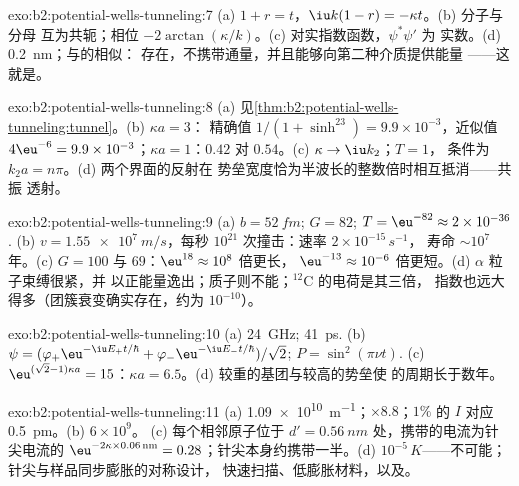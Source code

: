 \begin{solution}{exo:b2:potential-wells-tunneling:7}
(a) $1 + r = t$，$\iu k(1 - r) = -\kappa t$。(b) 分子与分母
互为共轭；相位 $-2\arctan(\kappa/k)$。(c) 对实指数函数，$\psi^*\psi'$ 为
实数。(d) \qty{0.2}{nm}；与的相似：
存在，不携带通量，并且能够向第二种介质提供能量
——这就是。
\end{solution}

\begin{solution}{exo:b2:potential-wells-tunneling:8}
(a) 见\cref{thm:b2:potential-wells-tunneling:tunnel}。(b) $\kappa a = 3$：
精确值 $1/(1 + \sinh^23) = 9.9 \times 10^{-3}$，近似值 $4\eu^{-6} = 9.9 \times
10^{-3}$；$\kappa a = 1$：$0.42$ 对 $0.54$。(c) $\kappa \to \iu k_2$；$T = 1$，
条件为 $k_2a = n\pi$。(d) 两个界面的反射在
势垒宽度恰为半波长的整数倍时相互抵消——共振
透射。
\end{solution}

\begin{solution}{exo:b2:potential-wells-tunneling:9}
(a) $b = \qty{52}{fm}$; $G = 82$; $T = \eu^{-82} \approx 2 \times 10^{-36}$. (b) $v =
\qty{1.55e7}{m/s}$，每秒 $10^{21}$ 次撞击：速率 $2 \times 10^{-15}\,\unit{s^{-1}}$，
寿命 $\sim 10^7$ 年。(c) $G = 100$ 与 $69$：$\eu^{18} \approx 10^8$ 倍更长，
$\eu^{-13} \approx 10^{-6}$ 倍更短。(d) $\alpha$ 粒子束缚很紧，并
以正能量逸出；质子则不能；$^{12}$C 的电荷是其三倍，
指数也远大得多（团簇衰变确实存在，约为 $10^{-10}$）。
\end{solution}

\begin{solution}{exo:b2:potential-wells-tunneling:10}
(a) \qty{24}{GHz}; \qty{41}{ps}. (b) $\psi = (\varphi_+\eu^{-\iu E_+t/\hbar} +
\varphi_-\eu^{-\iu E_-t/\hbar})/\sqrt2$; $P = \sin^2(\pi\nu t)$. (c) $\eu^{(\sqrt2 - 1)
\kappa a} = 15$：$\kappa a = 6.5$。(d) 较重的基团与较高的势垒使
的周期长于数年。
\end{solution}

\begin{solution}{exo:b2:potential-wells-tunneling:11}
(a) \qty{1.09e10}{m^{-1}}；$\times 8.8$；$1\%$ 的 $I$ 对应 \qty{0.5}{pm}。(b) $6 \times 10^9$。
(c) 每个相邻原子位于 $d' = \qty{0.56}{nm}$ 处，携带的电流为针尖电流的 $\eu^{-2\kappa \times 0.06\,\text{nm}}
= 0.28$；针尖本身约携带一半。(d)
$10^{-5}\,\unit{K}$——不可能；针尖与样品同步膨胀的对称设计，
快速扫描、低膨胀材料，以及。
\end{solution}

